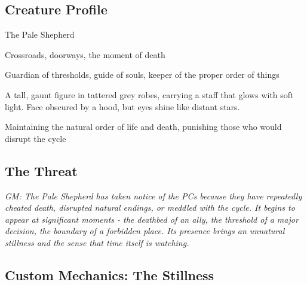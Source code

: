 \documentclass[11pt]{article}
\newcommand{\gm}[1]{\textit{GM: #1}}
\begin{document}
\subsection*{Creature Profile}

\begin{description}[leftmargin=*]
\item[Name] The Pale Shepherd
\item[Domain] Crossroads, doorways, the moment of death
\item[Nature] Guardian of thresholds, guide of souls, keeper of the proper order of things
\item[Appearance] A tall, gaunt figure in tattered grey robes, carrying a staff that glows with soft light. Face obscured by a hood, but eyes shine like distant stars.
\item[Motivation] Maintaining the natural order of life and death, punishing those who would disrupt the cycle
\end{description}

\subsection*{The Threat}

\gm{The Pale Shepherd has taken notice of the PCs because they have repeatedly cheated death, disrupted natural endings, or meddled with the cycle. It begins to appear at significant moments - the deathbed of an ally, the threshold of a major decision, the boundary of a forbidden place. Its presence brings an unnatural stillness and the sense that time itself is watching.}

\subsection*{Custom Mechanics: The Stillness}
\end{document}
